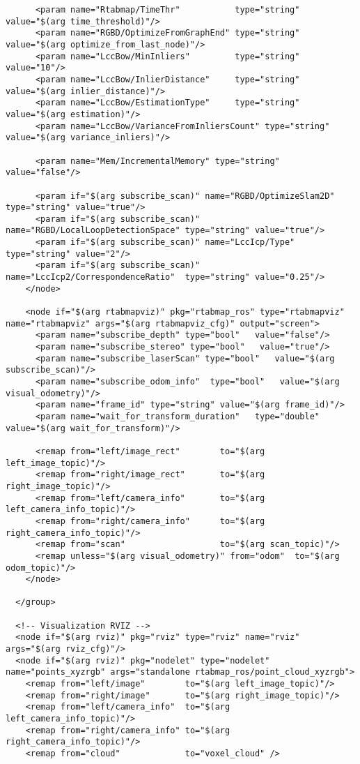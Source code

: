 \begin{center}
\begin{footnotesize}
\begin{verbatim}
      <param name="Rtabmap/TimeThr"           type="string" value="$(arg time_threshold)"/>
      <param name="RGBD/OptimizeFromGraphEnd" type="string" value="$(arg optimize_from_last_node)"/>
      <param name="LccBow/MinInliers"         type="string" value="10"/>
      <param name="LccBow/InlierDistance"     type="string" value="$(arg inlier_distance)"/>
      <param name="LccBow/EstimationType"     type="string" value="$(arg estimation)"/> 
      <param name="LccBow/VarianceFromInliersCount" type="string" value="$(arg variance_inliers)"/>

      <param name="Mem/IncrementalMemory" type="string" value="false"/> 
      
      <param if="$(arg subscribe_scan)" name="RGBD/OptimizeSlam2D"          type="string" value="true"/>
      <param if="$(arg subscribe_scan)" name="RGBD/LocalLoopDetectionSpace" type="string" value="true"/>
      <param if="$(arg subscribe_scan)" name="LccIcp/Type"                  type="string" value="2"/> 
	  <param if="$(arg subscribe_scan)" name="LccIcp2/CorrespondenceRatio"  type="string" value="0.25"/>
    </node>
  
    <node if="$(arg rtabmapviz)" pkg="rtabmap_ros" type="rtabmapviz" name="rtabmapviz" args="$(arg rtabmapviz_cfg)" output="screen">
      <param name="subscribe_depth" type="bool"   value="false"/>
      <param name="subscribe_stereo" type="bool"   value="true"/>
      <param name="subscribe_laserScan" type="bool"   value="$(arg subscribe_scan)"/>
      <param name="subscribe_odom_info"  type="bool"   value="$(arg visual_odometry)"/>
      <param name="frame_id" type="string" value="$(arg frame_id)"/>
      <param name="wait_for_transform_duration"   type="double"   value="$(arg wait_for_transform)"/>
    
      <remap from="left/image_rect"        to="$(arg left_image_topic)"/>
      <remap from="right/image_rect"       to="$(arg right_image_topic)"/>
      <remap from="left/camera_info"       to="$(arg left_camera_info_topic)"/>
      <remap from="right/camera_info"      to="$(arg right_camera_info_topic)"/>
      <remap from="scan"                   to="$(arg scan_topic)"/>
      <remap unless="$(arg visual_odometry)" from="odom"  to="$(arg odom_topic)"/>
    </node>
  
  </group>
  
  <!-- Visualization RVIZ -->
  <node if="$(arg rviz)" pkg="rviz" type="rviz" name="rviz" args="$(arg rviz_cfg)"/>
  <node if="$(arg rviz)" pkg="nodelet" type="nodelet" name="points_xyzrgb" args="standalone rtabmap_ros/point_cloud_xyzrgb">
    <remap from="left/image"        to="$(arg left_image_topic)"/>
    <remap from="right/image"       to="$(arg right_image_topic)"/>
    <remap from="left/camera_info"  to="$(arg left_camera_info_topic)"/>
    <remap from="right/camera_info" to="$(arg right_camera_info_topic)"/>
    <remap from="cloud"             to="voxel_cloud" />


\end{verbatim}
\end{footnotesize}
\end{center}
